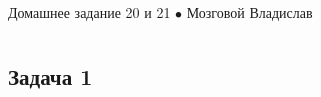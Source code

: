 \newpage
	{\large \hspace{3cm} \begin{center} Домашнее задание 20 и 21 $\bullet$ Мозговой Владислав \end{center} }
	\vspace{-1.5ex}
	\hrulefill
	
	\fontsize{12pt}{4.5mm}\selectfont
	\vspace{-3ex}
	\hrulefill
	\newline

	\section{}
		\subsection*{\textbf{Задача 1}}
